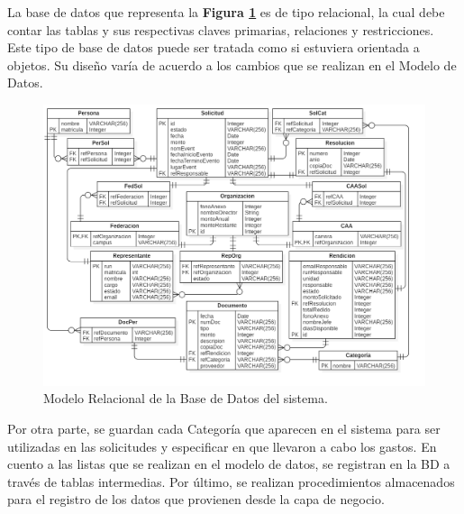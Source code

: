 La base de datos que representa la \textbf{Figura \ref{fig: Modelo_Relacional}} es de tipo relacional, la cual debe contar las tablas y sus respectivas claves primarias, relaciones y restricciones. Este tipo de base de datos puede ser tratada como si estuviera orientada a objetos. Su diseño varía de acuerdo a los cambios que se realizan en el Modelo de Datos. 

\begin{figure}[htb]
    \includegraphics[width=\textwidth]{Imagenes/Modelo_relacional_bd.png}
    \caption{\label{fig: Modelo_Relacional}Modelo Relacional de la Base de Datos del sistema.}
\end{figure}

Por otra parte, se guardan cada Categoría que aparecen en el sistema para ser utilizadas en las solicitudes y especificar en que llevaron a cabo los gastos. En cuento a las listas que se realizan en el modelo de datos, se registran en la BD a través de tablas intermedias. Por último, se realizan procedimientos almacenados para el registro de los datos que provienen desde la capa de negocio. 

